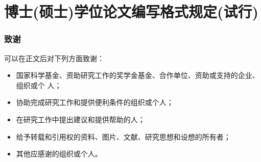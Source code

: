 \documentclass[phd,nobackinfo]{scutthesis}
\begin{document}
\chapter{博士(硕士)学位论文编写格式规定(试行)}


\subsection{致谢}

可以在正文后对下列方面致谢：

\begin{itemize}
\item 国家科学基金、资助研究工作的奖学金基金、合作单位、资助或支持的企业、组织或个
人；
\item 协助完成研究工作和提供便利条件的组织或个人；
\item 在研究工作中提出建议和提供帮助的人；
\item 给予转载和引用权的资料、图片、文献、研究思想和设想的所有者；
\item 其他应感谢的组织或个人。
\end{itemize}

\nocite{*}

\end{document}
